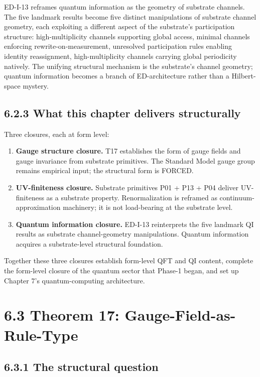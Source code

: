 \documentclass[11pt]{book}
\begin{document}
ED-I-13 reframes quantum information as the geometry of substrate channels. The five landmark results become five distinct manipulations of substrate channel geometry, each exploiting a different aspect of the substrate's participation structure: high-multiplicity channels supporting global access, minimal channels enforcing rewrite-on-measurement, unresolved participation rules enabling identity reassignment, high-multiplicity channels carrying global periodicity natively. The unifying structural mechanism is the substrate's channel geometry; quantum information becomes a branch of ED-architecture rather than a Hilbert-space mystery.

\subsection{6.2.3 What this chapter delivers structurally}

Three closures, each at form level:

\begin{enumerate}
\item \textbf{Gauge structure closure.} T17 establishes the form of gauge fields and gauge invariance from substrate primitives. The Standard Model gauge group remains empirical input; the structural form is FORCED.
\item \textbf{UV-finiteness closure.} Substrate primitives P01 + P13 + P04 deliver UV-finiteness as a substrate property. Renormalization is reframed as continuum-approximation machinery; it is not load-bearing at the substrate level.
\item \textbf{Quantum information closure.} ED-I-13 reinterprets the five landmark QI results as substrate channel-geometry manipulations. Quantum information acquires a substrate-level structural foundation.
\end{enumerate}

Together these three closures establish form-level QFT and QI content, complete the form-level closure of the quantum sector that Phase-1 began, and set up Chapter 7's quantum-computing architecture.

\section{6.3 Theorem 17: Gauge-Field-as-Rule-Type}

\subsection{6.3.1 The structural question}
\end{document}
